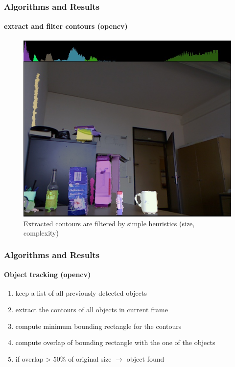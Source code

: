 \documentclass[]{beamer}
\begin{document}
\begin{frame}
    \frametitle{Algorithms and Results}
    \framesubtitle{extract and filter contours (opencv)}
    \begin{figure}[h]
        \centering
    \includegraphics[height=0.6\textheight]{../images/extracted_contours.jpg}
        \caption{Extracted contours are filtered by simple heuristics (size, complexity)}
        \label{sg:fig:images_extracted_contours}
    \end{figure}
\end{frame}


\begin{frame}
    \frametitle{Algorithms and Results}
    \framesubtitle{Object tracking (opencv)}
    
    \begin{enumerate}
        \item<1-> keep a list of all previously detected objects
        \item<2-> extract the contours of all objects in current frame
        \item<3-> compute minimum bounding rectangle for the contours
        \item<4-> compute overlap of bounding rectangle with the one of the objects
        \item<5-> if overlap > 50\% of original size $\rightarrow$ object found
    \end{enumerate}
\end{frame}
\end{document}
